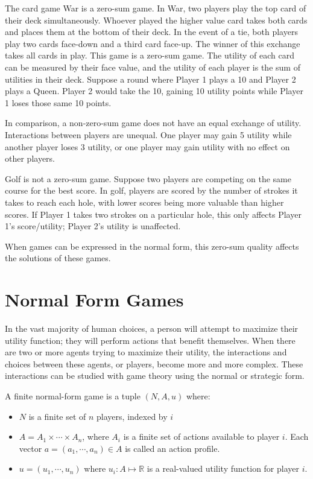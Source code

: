 \begin{exmp}
  The card game War is a zero-sum game. In War, two players play the top card of their deck simultaneously. Whoever played the higher value card takes both cards and places them at the bottom of their deck. In the event of a tie, both players play two cards face-down and a third card face-up. The winner of this exchange takes all cards in play. This game is a zero-sum game. The utility of each card can be measured by their face value, and the utility of each player is the sum of utilities in their deck. Suppose a round where Player 1 plays a 10 and Player 2 plays a Queen. Player 2 would take the 10, gaining 10 utility points while Player 1 loses those same 10 points.
\end{exmp}

In comparison, a non-zero-sum game does not have an equal exchange of utility. Interactions between players are unequal. One player may gain 5 utility while another player loses 3 utility, or one player may gain utility with no effect on other players.

\begin{exmp}
  Golf is not a zero-sum game. Suppose two players are competing on the same course for the best score. In golf, players are scored by the number of strokes it takes to reach each hole, with lower scores being more valuable than higher scores. If Player 1 takes two strokes on a particular hole, this only affects Player 1's score/utility; Player 2's utility is unaffected.
\end{exmp}

When games can be expressed in the normal form, this zero-sum quality affects the solutions of these games.

\section{Normal Form Games}
In the vast majority of human choices, a person will attempt to maximize their utility function; they will perform actions that benefit themselves. When there are two or more agents trying to maximize their utility, the interactions and choices between these agents, or players, become more and more complex. These interactions can be studied with game theory using the normal or strategic form.
\begin{define}
  A finite normal-form game is a tuple $(N, A, u)$ where:
  \begin{itemize}
  \item $N$ is a finite set of $n$ players, indexed by $i$
  \item $A=A_1\times\cdots\times A_n$, where $A_i$ is a finite set of actions available to player $i$. Each vector $a=(a_1,\cdots ,a_n)\in A$ is called an action profile.
    \item $u=(u_1,\cdots ,u_n)$ where $u_i : A \mapsto\mathbb{R}$ is a real-valued utility function for player $i$. \cite{shoh09}
\end{itemize}
\end{define}

